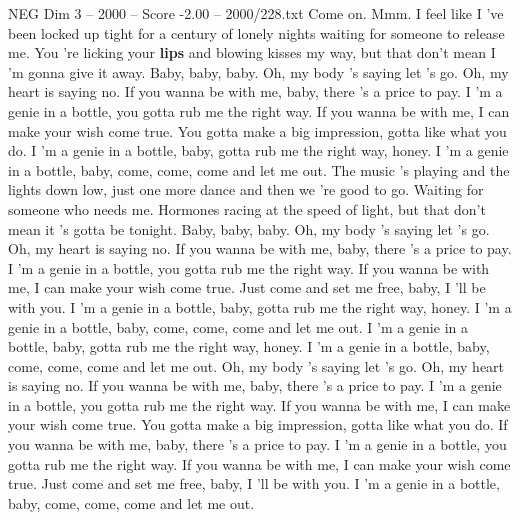 \begin{textsample}{NEG Dim 3 – 2000 – Score -2.00 – 2000/228.txt}  \label{ex:f3_neg_005}
Come on.
Mmm.
I feel like I 've been locked up tight for a century of lonely nights waiting for someone to release me.
You 're licking your \textbf{lips} and blowing kisses my way, but that don't mean I 'm gonna give it away.
Baby, baby, baby.
Oh, my body 's saying let 's go.
Oh, my heart is saying no.
If you wanna be with me, baby, there 's a price to pay.
I 'm a genie in a bottle, you gotta rub me the right way.
If you wanna be with me, I can make your wish come true.
You gotta make a big impression, gotta like what you do.
I 'm a genie in a bottle, baby, gotta rub me the right way, honey.
I 'm a genie in a bottle, baby, come, come, come and let me out.
The music 's playing and the lights down low, just one more dance and then we 're good to go.
Waiting for someone who needs me.
Hormones racing at the speed of light, but that don't mean it 's gotta be tonight.
Baby, baby, baby.
Oh, my body 's saying let 's go.
Oh, my heart is saying no.
If you wanna be with me, baby, there 's a price to pay.
I 'm a genie in a bottle, you gotta rub me the right way.
If you wanna be with me, I can make your wish come true.
Just come and set me free, baby, I 'll be with you.
I 'm a genie in a bottle, baby, gotta rub me the right way, honey.
I 'm a genie in a bottle, baby, come, come, come and let me out.
I 'm a genie in a bottle, baby, gotta rub me the right way, honey.
I 'm a genie in a bottle, baby, come, come, come and let me out.
Oh, my body 's saying let 's go.
Oh, my heart is saying no.
If you wanna be with me, baby, there 's a price to pay.
I 'm a genie in a bottle, you gotta rub me the right way.
If you wanna be with me, I can make your wish come true.
You gotta make a big impression, gotta like what you do.
If you wanna be with me, baby, there 's a price to pay.
I 'm a genie in a bottle, you gotta rub me the right way.
If you wanna be with me, I can make your wish come true.
Just come and set me free, baby, I 'll be with you.
I 'm a genie in a bottle, baby, come, come, come and let me out.

\end{textsample}
